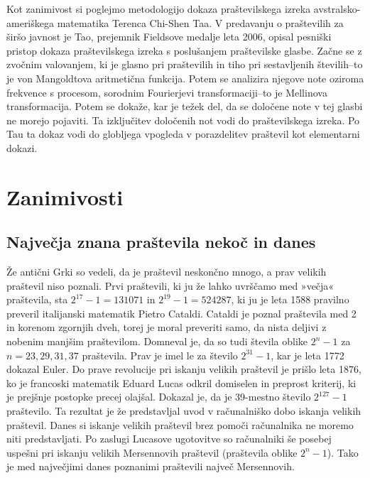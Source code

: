 \documentclass[a4paper,12pt]{article}
\begin{document}
\noindent Kot zanimivost si poglejmo metodologijo dokaza praštevilskega izreka avstralsko-ameriškega
matematika Terenca Chi-Shen Taa.
V predavanju o praštevilih za širšo javnost je Tao, prejemnik Fieldsove medalje
leta 2006, opisal pesniški pristop dokaza praštevilskega izreka s poslušanjem
praštevilske glasbe. Začne se z zvočnim valovanjem, ki je glasno pri praštevilih
in tiho pri sestavljenih številih--to je von Mangoldtova aritmetična funkcija.
Potem se analizira njegove note oziroma frekvence s procesom, sorodnim Fourierjevi
transformaciji--to je Mellinova transformacija. Potem se dokaže, kar je
težek del, da se določene note v tej glasbi ne morejo pojaviti. Ta izključitev
določenih not vodi do praštevilskega izreka. Po Tau ta dokaz vodi do globljega
vpogleda v porazdelitev praštevil kot elementarni dokazi.

\newpage
\section{Zanimivosti}
\subsection{Največja znana praštevila nekoč in danes}
Že antični Grki so vedeli, da je praštevil neskončno mnogo, a prav velikih praštevil
niso poznali.
Prvi praštevili, ki ju že lahko uvrščamo med »večja« praštevila, sta $2^{17}-1 =
131071$ in $2^{19}-1 = 524287$, ki ju je leta 1588 pravilno preveril italijanski matematik
Pietro Cataldi. Cataldi je poznal praštevila med 2 in korenom zgornjih
dveh, torej je moral preveriti samo, da nista deljivi z nobenim manjšim praštevilom.
Domneval je, da so tudi števila oblike $2^n-1$ za $n = 23, 29, 31, 37$
praštevila. Prav je imel le za število $2^{31}-1$, kar je leta 1772 dokazal Euler.
Do prave revolucije pri iskanju velikih praštevil je prišlo leta 1876, ko je francoski
matematik Eduard Lucas odkril domiselen in preprost kriterij, ki je prejšnje
postopke precej olajšal. Dokazal je, da je 39-mestno število $2^{127}-1$ praštevilo.
Ta rezultat je že predstavljal uvod v računalniško dobo iskanja velikih praštevil.
Danes si iskanje velikih praštevil brez pomoči računalnika ne moremo niti predstavljati.
Po zaslugi Lucasove ugotovitve so računalniki še posebej uspešni pri
iskanju velikih Mersennovih praštevil (praštevila oblike $2^n-1$). Tako je med
največjimi danes poznanimi praštevili največ Mersennovih.
\end{document}
